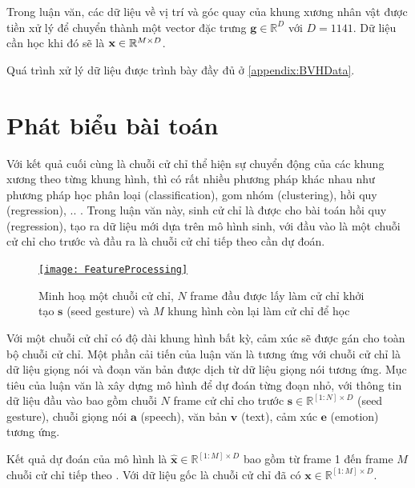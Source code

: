 Trong luận văn, các dữ liệu về vị trí và góc quay của khung xương nhân vật được tiền xử lý để chuyển thành một vector đặc trưng $\mathbf{g} \in \mathbb{R}^{D}$ với $D=1141$. Dữ liệu cần học khi đó sẽ là $\mathbf{x} \in \mathbb{R}^{M \times D}$.

Quá trình xử lý dữ liệu được trình bày đầy đủ ở \autoref{appendix:BVHData}.

\section{Phát biểu bài toán}
\label{sec:ProblemStatement}

Với kết quả cuối cùng là chuỗi cử chỉ thể hiện sự chuyển động của các khung xương theo từng khung hình, thì có rất nhiều phương pháp khác nhau như phương pháp học phân loại (classification), gom nhóm (clustering), hồi quy (regression), .. . Trong luận văn này, sinh cử chỉ là  được cho bài toán hồi quy (regression), tạo ra dữ liệu mới dựa trên mô hình sinh, với đầu vào là một chuỗi cử chỉ cho trước và đầu ra là chuỗi cử chỉ tiếp theo cần dự đoán.
	
\begin{figure}[H]
	\centering
	\href{https://www.youtube.com/watch?v=B6nv1kQmi-Q}{\texttt{[image: FeatureProcessing]}}
	\caption{Minh hoạ một chuỗi cử chỉ, $N$ frame đầu được lấy làm cử chỉ khởi tạo $\mathbf{s}$ (seed gesture) và $M$ khung hình còn lại làm cử chỉ để học}
	\label{fig:GestureSeries}
\end{figure}

Với một chuỗi cử chỉ có độ dài khung hình bất kỳ, cảm xúc sẽ được gán cho toàn bộ chuỗi cử chỉ. Một phần cải tiến của luận văn là tương ứng với chuỗi cử chỉ là dữ liệu giọng nói và đoạn văn bản được dịch từ dữ liệu giọng nói tương ứng.
Mục tiêu của luận văn là xây dựng mô hình để dự đoán từng đoạn nhỏ, với thông tin dữ liệu đầu vào bao gồm chuỗi $N$ frame cử chỉ cho trước $\mathbf{s} \in \mathbb{R}^{[1:N] \times D}$ (seed gesture), chuỗi giọng nói $\mathbf{a}$ (speech), văn bản $\mathbf{v}$ (text),  cảm xúc $\mathbf{e}$ (emotion) tương ứng.

Kết quả dự đoán của mô hình là $\hat{\mathbf{x}} \in \mathbb{R}^{[1:M] \times D}$ bao gồm từ frame 1 đến frame $M$ chuỗi cử chỉ tiếp theo . Với dữ liệu gốc là chuỗi cử chỉ đã có $\mathbf{x}  \in \mathbb{R}^{[1:M] \times D}$.

